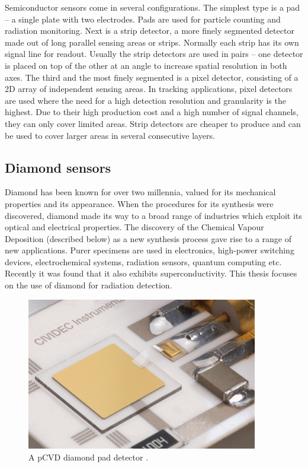 Semiconductor sensors come in several configurations. The simplest type is a pad -- a single plate with two electrodes. Pads are used for particle counting and radiation monitoring. Next is a strip detector, a more finely segmented detector made out of long parallel sensing areas or strips. Normally each strip has its own signal line for readout. Usually the strip detectors are used in pairs -- one detector is placed on top of the other at an angle to increase spatial resolution in both axes. The third and the most finely segmented is a pixel detector, consisting of a 2D array of independent sensing areas. In tracking applications, pixel detectors are used where the need for a high detection resolution and granularity is the highest. Due to their high production cost and a high number of signal channels, they can only cover limited areas. Strip detectors are cheaper to produce and can be used to cover larger areas in several consecutive layers.

\subsection{Diamond sensors}
Diamond has been known for over two millennia, valued for its mechanical properties and its appearance. When the procedures for its synthesis were discovered, diamond made its way to a broad range of industries which exploit its optical and electrical properties. The discovery of the Chemical Vapour Deposition (described below) as a new synthesis process gave rise to a range of new applications. Purer specimens are used in electronics, high-power switching devices, electrochemical systems, radiation sensors, quantum computing etc. Recently it was found that it also exhibits superconductivity. This thesis focuses on the use of diamond for radiation detection.
\begin{figure}[!t]
\centering
\includegraphics[width=0.9\textwidth]{01_introduction/pics/cividecpcvd}
\caption{A pCVD diamond pad detector \cite{Cividec:00000}.}
\label{fig:cividecpcvd}
\end{figure}

